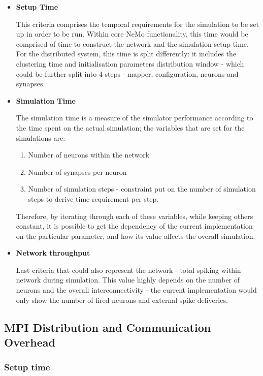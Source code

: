 \begin{itemize}
\item{\textbf{Setup Time}}

This criteria comprises the temporal requirements for the simulation to be set up in order to be run. Within core NeMo functionality, this time would be comprised of time to construct the network and the simulation setup time. For the distributed system, this time is split differently: it includes the clustering time and initialisation parameters distribution window - which could be further split into 4 steps - mapper, configuration, neurons and synapses.

\item{\textbf{Simulation Time}}

The simulation time is a measure of the simulator performance according to the time spent on the actual simulation; the variables that are set for the simulations are:

\begin{enumerate}	
	\item{Number of neurons} within the network
	\item{Number of synapses per neuron}
	\item{Number of simulation steps} - constraint put on the number of simulation steps to derive time requirement per step.
\end{enumerate}

Therefore, by iterating through each of these variables, while keeping others constant, it is possible to get the dependency of the current implementation on the particular parameter, and how its value affects the overall simulation.

\item{\textbf{Network throughput}}

Last criteria that could also represent the network - total spiking within network during simulation. This value highly depends on the number of neurons and the overall interconnectivity - the current implementation would only show the number of fired neurons and external spike deliveries.

\end{itemize}

\subsection{MPI Distribution and Communication Overhead}



\subsubsection{Setup time}

